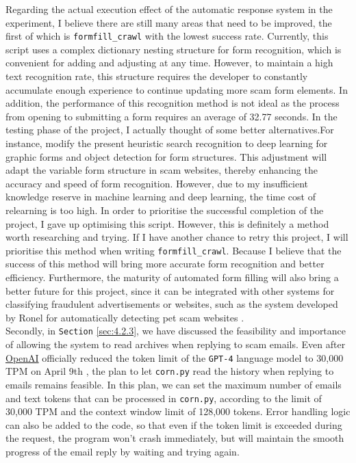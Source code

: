 \documentclass[ oneside,%
                    author={Cassie Qing Tang},
                    degree={BSc},
                     title={An Automated Response System for Disrupting Online Pet Scamming \\ },
                    subtitle={ }]{dissertation}
\begin{document}
Regarding the actual execution effect of the automatic response system in the experiment, I believe there are still many areas that need to be improved, the first of which is \texttt{formfill\_crawl} with the lowest success rate. Currently, this script uses a complex dictionary nesting structure for form recognition, which is convenient for adding and adjusting at any time. However, to maintain a high text recognition rate, this structure requires the developer to constantly accumulate enough experience to continue updating more scam form elements. In addition, the performance of this recognition method is not ideal as the process from opening to submitting a form requires an average of 32.77 seconds. In the testing phase of the project, I actually thought of some better alternatives.For instance, modify the present heuristic search recognition to deep learning for graphic forms and object detection for form structures. This adjustment will adapt the variable form structure in scam websites, thereby enhancing the accuracy and speed of form recognition. However, due to my insufficient knowledge reserve in machine learning and deep learning, the time cost of relearning is too high. In order to prioritise the successful completion of the project, I gave up optimising this script. However, this is definitely a method worth researching and trying. If I have another chance to retry this project, I will prioritise this method when writing \texttt{formfill\_crawl}. Because I believe that the success of this method will bring more accurate form recognition and better efficiency. Furthermore, the maturity of automated form filling will also bring a better future for this project, since it can be integrated with other systems for classifying fraudulent advertisements or websites, such as the system developed by Ronel for automatically detecting pet scam websites \cite{mehmedov_automated_2021}.
\\

Secondly, in \texttt{Section} \ref{sec:4.2.3}, we have discussed the feasibility and importance of allowing the system to read archives when replying to scam emails. Even after \href{https://openai.com/}{OpenAI} officially reduced the token limit of the \texttt{GPT-4} language model to 30,000 TPM on April 9th \cite{noauthor_openai_nodate}, the plan to let \texttt{corn.py} read the history when replying to emails remains feasible. In this plan, we can set the maximum number of emails and text tokens that can be processed in \texttt{corn.py}, according to the limit of 30,000 TPM and the context window limit of 128,000 tokens. Error handling logic can also be added to the code, so that even if the token limit is exceeded during the request, the program won't crash immediately, but will maintain the smooth progress of the email reply by waiting and trying again.
\\
\end{document}
